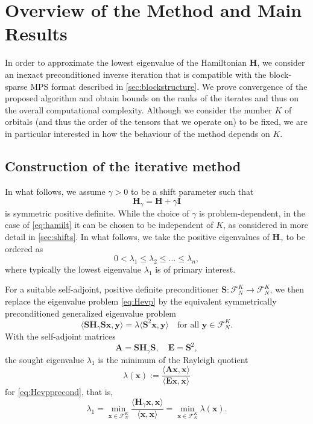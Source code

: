 \documentclass[a4paper,11pt,oneside]{amsart}
\theoremstyle{definition}
\theoremstyle{remark}
\newcommand{\A}{\ten A}
\newcommand{\E}{\ten E}
\newcommand{\ten}[1]{\boldsymbol{#1}}
\numberwithin{equation}{section}
\numberwithin{theorem}{section}
\begin{document}
\section{Overview of the Method and Main Results}\label{sec:overview}

In order to approximate the lowest eigenvalue of the Hamiltonian $\ten H$, we consider an inexact preconditioned inverse iteration that is compatible with the block-sparse MPS format described in \cref{sec:blockstructure}. We prove convergence of the proposed algorithm and obtain bounds on the ranks of the iterates and thus on the overall computational complexity. 
Although we consider the number $K$ of orbitals (and thus the order of the tensors that we operate on) to be fixed, we are in particular interested in how the behaviour of the method depends on $K$.

\subsection{Construction of the iterative method}\label{sec:construction}

In what follows, we assume $\gamma>0$ to be a shift parameter such that 
\[ \ten H_\gamma = \ten H + \gamma \ten I \] is symmetric positive definite. 
While the choice of $\gamma$ is problem-dependent, in the case of \eqref{eq:hamilt} it can be chosen to be independent of $K$, as considered in more detail in \cref{sec:shifts}.
In what follows, we take the positive eigenvalues of $\ten H_\gamma$ to be ordered as 
\begin{equation}\label{eq:eigenvalueordering}
0 < \lambda_1 \leq \lambda_2 \leq \ldots\leq \lambda_n, 
\end{equation}
 where typically the lowest eigenvalue $\lambda_1$ is of primary interest.

For a suitable self-adjoint, positive definite preconditioner $\ten S: \mathcal{F}_N^K \rightarrow \mathcal{F}_N^K$, we then replace the eigenvalue problem \cref{eq:Hevp} by the
equivalent symmetrically preconditioned generalized eigenvalue problem
\begin{equation}
\label{eq:Hevpprecond}
 \langle \ten S \ten H_\gamma \ten S \ten x, \ten y \rangle = \lambda \langle \ten S^2 \ten x, \ten y \rangle \quad\text{for all $\ten y \in \mathcal{F}_N^K$.}
\end{equation}
With the self-adjoint matrices
\[
   \A = \ten S \ten H_\gamma \ten S, \quad \E = \ten S^2, 
\]
the sought eigenvalue $\lambda_1$ is the minimum of the Rayleigh quotient 
\begin{equation}\label{eq:rayleigh1}
  \lambda (\ten x) := \frac{\langle \A \ten x, \ten x\rangle }{\langle \E \ten x ,\ten x \rangle }
\end{equation}
for \cref{eq:Hevpprecond}, that is,
\[
    \lambda_1  
   = \min_{\ten x \in \mathcal{F}_N^K} \frac{\langle \ten{H}_\gamma \ten x , \ten x\rangle }{\langle \ten x,\ten x \rangle}= \min_{\ten x \in \mathcal{F}_N^K} \lambda (\ten x) .
\]
\end{document}

